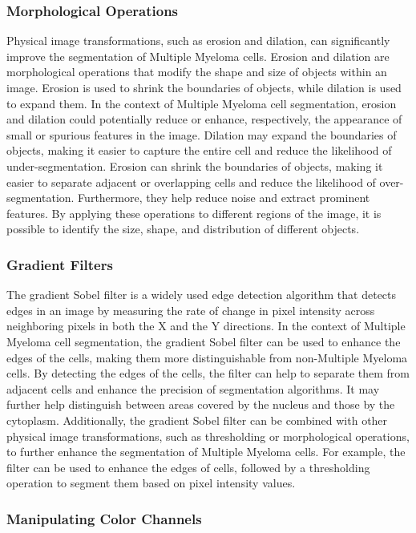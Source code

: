 \documentclass{article}
\begin{document}
\subsubsection{Morphological Operations}

Physical image transformations, such as erosion and dilation, can significantly improve the segmentation of Multiple Myeloma cells. Erosion and dilation are morphological operations that modify the shape and size of objects within an image. Erosion is used to shrink the boundaries of objects, while dilation is used to expand them. In the context of Multiple Myeloma cell segmentation, erosion and dilation could potentially reduce or enhance, respectively, the appearance of small or spurious features in the image. Dilation may expand the boundaries of objects, making it easier to capture the entire cell and reduce the likelihood of under-segmentation. Erosion can shrink the boundaries of objects, making it easier to separate adjacent or overlapping cells and reduce the likelihood of over-segmentation. Furthermore, they help reduce noise and extract prominent features. By applying these operations to different regions of the image, it is possible to identify the size, shape, and distribution of different objects.

\subsubsection{Gradient Filters}

The gradient Sobel filter is a widely used edge detection algorithm that detects edges in an image by measuring the rate of change in pixel intensity across neighboring pixels in both the X and the Y directions. In the context of Multiple Myeloma cell segmentation, the gradient Sobel filter can be used to enhance the edges of the cells, making them more distinguishable from non-Multiple Myeloma cells. By detecting the edges of the cells, the filter can help to separate them from adjacent cells and enhance the precision of segmentation algorithms. It may further help distinguish between areas covered by the nucleus and those by the cytoplasm. Additionally, the gradient Sobel filter can be combined with other physical image transformations, such as thresholding or morphological operations, to further enhance the segmentation of Multiple Myeloma cells. For example, the filter can be used to enhance the edges of cells, followed by a thresholding operation to segment them based on pixel intensity values.

\subsubsection{Manipulating Color Channels}
\end{document}
